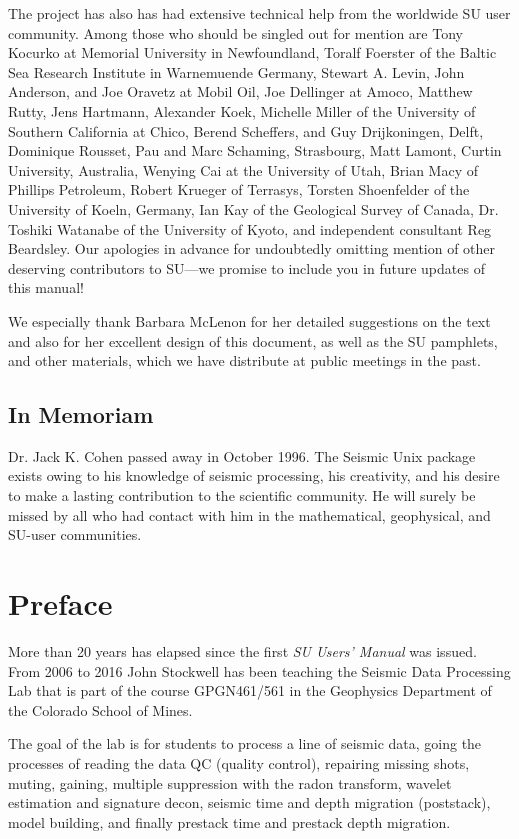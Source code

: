 The project has also has had extensive technical help from the
worldwide SU user community.
Among those who should be singled out for mention are Tony Kocurko at
Memorial University in Newfoundland, Toralf Foerster of the 
Baltic Sea Research Institute in Warnemuende Germany, Stewart A. Levin, John
Anderson, and Joe Oravetz at Mobil Oil, Joe Dellinger at Amoco, Matthew
Rutty, Jens Hartmann, Alexander Koek, Michelle Miller
of the University of Southern California at Chico,
Berend Scheffers, and Guy Drijkoningen, Delft,
Dominique Rousset, Pau and Marc Schaming, Strasbourg,
Matt Lamont, Curtin University, Australia, 
Wenying Cai at the University of Utah, Brian Macy of Phillips Petroleum,
Robert Krueger of Terrasys, Torsten Shoenfelder of the University
of Koeln, Germany, Ian Kay of the Geological Survey of Canada,
Dr. Toshiki Watanabe of the University of Kyoto, and independent
consultant Reg Beardsley.
Our apologies in advance for undoubtedly omitting mention 
of other deserving contributors to
 SU---we promise to include you in future updates of this manual!

We especially thank Barbara McLenon for her detailed suggestions on the text
and also for her excellent design of this document, as well as the
SU pamphlets, and other materials, which we have distribute at public meetings
in the past.

\section*{In Memoriam}
Dr. Jack K. Cohen passed away in October 1996. The Seismic Unix
package exists owing to his knowledge of seismic processing,
his creativity, and his desire to make a lasting contribution
to the scientific community.  He will surely be missed by all
who had contact with him in the mathematical, geophysical, and 
SU-user communities.
\chapter*{Preface}
More than 20 years has elapsed since the first {\em SU Users' Manual\/}
was issued. From 2006 to 2016 John Stockwell has been teaching
the Seismic Data Processing Lab that is part of the course
GPGN461/561 in the Geophysics Department of the Colorado School
of Mines.

The goal of the lab is for students to process a line of seismic
data, going the processes of reading the data QC (quality control),
repairing missing shots, muting, gaining, multiple suppression
with the radon transform, wavelet estimation and signature decon,
seismic time and depth migration (poststack), model building, and finally
prestack time and prestack depth migration. 

